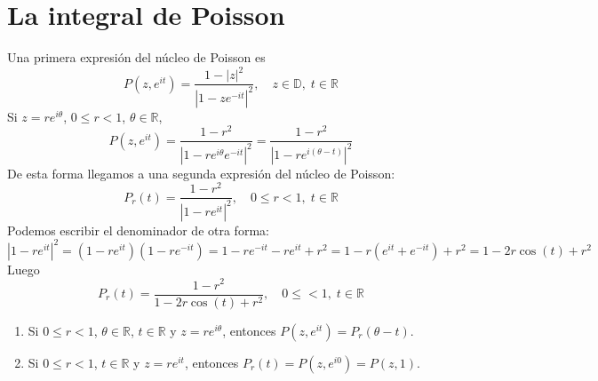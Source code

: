 \section{La integral de Poisson}
Una primera expresión del núcleo de Poisson es
$$P(z, e^{it}) = \frac{1-|z|^2}{|1-ze^{-it}|^2}, \quad z \in \mathbb{D}, \; t \in \mathbb{R}$$
Si $z = re^{i\theta}$, $0 \leq r < 1$, $\theta \in \mathbb{R}$,
$$P(z, e^{it}) = \frac{1-r^2}{|1-re^{i\theta}e^{-it}|^2} = \frac{1-r^2}{|1-re^{i(\theta-t)}|^2}$$
De esta forma llegamos a una segunda expresión del núcleo de Poisson:
$$P_r(t) = \frac{1-r^2}{|1-re^{it}|^2}, \quad 0 \leq r < 1, \; t \in \mathbb{R}$$
Podemos escribir el denominador de otra forma:
$$|1-re^{it}|^2 = (1-re^{it})(1-re^{-it}) = 1 - re^{-it} - re^{it} + r^2 = 1 - r(e^{it}+e^{-it}) + r^2 = 1 - 2r\cos(t) + r^2$$
Luego
$$P_r(t) = \frac{1-r^2}{1 - 2r\cos(t) + r^2}, \quad 0 \leq < 1, \; t \in \mathbb{R}$$

\begin{remark}
    \hfill
    \begin{enumerate}
        \item Si $0 \leq r < 1$, $\theta \in \mathbb{R}$, $t \in \mathbb{R}$ y $z = re^{i\theta}$, entonces $P(z, e^{it}) = P_r(\theta-t)$.
        \item Si $0 \leq r < 1$, $t \in \mathbb{R}$ y $z = re^{it}$, entonces $P_r(t) = P(z, e^{i0}) = P(z, 1)$.
    \end{enumerate}
\end{remark}

